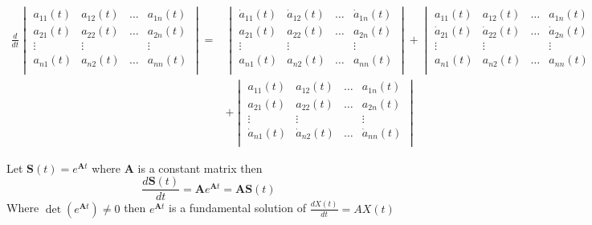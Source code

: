 \begin{align*}
    \frac{d}{dt} \begin{vmatrix}
                     a_{11}(t) & a_{12}(t) & \dots & a_{1n}(t) \\
                     a_{21}(t) & a_{22}(t) & \dots & a_{2n}(t) \\
                     \vdots    & \vdots    &       & \vdots    \\
                     a_{n1}(t) & a_{n2}(t) & \dots & a_{nn}(t) \\
                 \end{vmatrix}
    = &
    \begin{vmatrix}
        \dot{a}_{11}(t) & \dot{a}_{12}(t) & \dots & \dot{a}_{1n}(t) \\
        a_{21}(t)       & a_{22}(t)       & \dots & a_{2n}(t)       \\
        \vdots          & \vdots          &       & \vdots          \\
        a_{n1}(t)       & a_{n2}(t)       & \dots & a_{nn}(t)       \\
    \end{vmatrix}
    +
    \begin{vmatrix}
        a_{11}(t)       & a_{12}(t)       & \dots & a_{1n}(t)       \\
        \dot{a}_{21}(t) & \dot{a}_{22}(t) & \dots & \dot{a}_{2n}(t) \\
        \vdots          & \vdots          &       & \vdots          \\
        a_{n1}(t)       & a_{n2}(t)       & \dots & a_{nn}(t)       \\
    \end{vmatrix}
    +
    \dots
    \\
      & +
    \begin{vmatrix}
        a_{11}(t)       & a_{12}(t)       & \dots & a_{1n}(t)       \\
        a_{21}(t)       & a_{22}(t)       & \dots & a_{2n}(t)       \\
        \vdots          & \vdots          &       & \vdots          \\
        \dot{a}_{n1}(t) & \dot{a}_{n2}(t) & \dots & \dot{a}_{nn}(t) \\
    \end{vmatrix}
\end{align*}
\begin{lemma}
    Let $\displaystyle \mathbf{S}(t) = e^{\mathbf{A}t}$ where $\mathbf{A}$ is a constant matrix then
    \[
        \frac{d\mathbf{S}(t)}{dt} = \mathbf{A}e^{\mathbf{A}t} = \mathbf{A}\mathbf{S}(t)
    \]
    Where $\det(e^{\mathbf{A}t})\neq 0$
    then $e^{\mathbf{A}t}$ is a fundamental solution of $\displaystyle \frac{dX(t)}{dt} = AX(t)$
\end{lemma}
